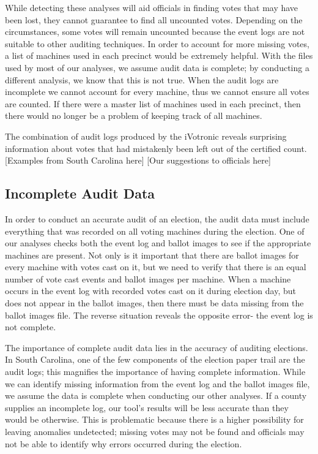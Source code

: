 While detecting these analyses will aid officials in finding votes that may have been lost, they cannot guarantee to find all uncounted votes.  Depending on the circumstances, some votes will remain uncounted because the event logs are not suitable to other auditing techniques.  In order to account for more missing votes, a list of machines used in each precinct would be extremely helpful.  With the files used by most of our analyses, we assume audit data is complete; by conducting a different analysis, we know that this is not true.  When the audit logs are incomplete we cannot account for every machine, thus we cannot ensure all votes are counted.  If there were a master list of machines used in each precinct, then there would no longer be a problem of keeping track of all machines.  

The combination of audit logs produced by the iVotronic reveals surprising information about votes that had mistakenly been left out of the certified count.  [Examples from South Carolina here] [Our suggestions to officials here]

\subsection{Incomplete Audit Data}
In order to conduct an accurate audit of an election, the audit data must include everything that was recorded on all voting machines during the election.  One of our analyses checks both the event log and ballot images to see if the appropriate machines are present.  Not only is it important that there are ballot images for every machine with votes cast on it, but we need to verify that there is an equal number of vote cast events and ballot images per machine.  When a machine occurs in the event log with recorded votes cast on it during election day, but does not appear in the ballot images, then there must be data missing from the ballot images file.  The reverse situation reveals the opposite error- the event log is not complete.  

The importance of complete audit data lies in the accuracy of auditing elections.  In South Carolina, one of the few components of the election paper trail are the audit logs; this magnifies the importance of having complete information.  While we can identify missing information from the event log and the ballot images file, we assume the data is complete when conducting our other analyses.  If a county supplies an incomplete log, our tool's results will be less accurate than they would be otherwise.  This is problematic because there is a higher possibility for leaving anomalies undetected; missing votes may not be found and officials may not be able to identify why errors occurred during the election.  

